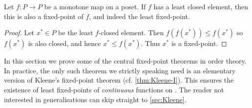 \begin{lemma}
    \label{lem:least-closed-implies-fixed-point}
    Let $f \colon P \to P$ be a monotone map on a poset. If $f$ has a least closed element, then this is also a fixed-point of $f$, and indeed the least fixed-point.
\end{lemma}

\begin{proof}
    Let $x^* \in P$ be the least $f$-closed element. Then $f(f(x^*)) \leq f(x^*)$ so $f(x^*)$ is also closed, and hence $x^* \leq f(x^*)$. Thus $x^*$ is a fixed-point.
\end{proof}


In this section we prove some of the central fixed-point theorems in order theory. In practice, the only such theorem we strictly speaking need is an elementary version of Kleene's fixed-point theorem (cf. \cref{thm:Kleene-I}). This ensures the existence of least fixed-points of \emph{continuous} functions on \cCPOpl. The reader not interested in generalisations can skip straight to \cref{sec:Kleene}.

